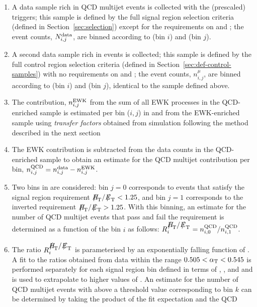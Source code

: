 \begin{enumerate}
\item\label{item:data} A data sample rich in QCD multijet events is
  collected with the (prescaled) \httrigger triggers; this sample is
  defined by the full signal region selection criteria (defined in
  Section~\ref{sec:selection}) except for the requirements on \alphat
  and \mhtmet; the event counts, $N^{\rm data}_{i,j}$, are binned
  according to \alphat (bin $i$) and \mhtmet (bin $j$).
\item\label{item:mj} A second data sample rich in \mj events is
  collected; this sample
  is defined by the full \mj control region selection criteria
  (defined in Section~\ref{sec:def-control-samples}) with no
  requirements on \alphat and \mhtmet; the event counts,
  $n^{\mu}_{i,j}$, are binned according to \alphat (bin $i$) and
  \mhtmet (bin $j$), identical to the sample defined above.
\item\label{item:ewk} The contribution, $n^{\rm EWK}_{i,j}$ from the
  sum of all EWK processes in the QCD-enriched sample is estimated per
  bin ($i,j$) in \alphat and \mhtmet from the EWK-enriched \mj sample
  using {\it transfer factors} obtained from simulation following the
  method described in the next section
\item\label{item:qcd} The EWK contribution is subtracted from the data
  counts in the QCD-enriched sample to obtain an estimate for the QCD
  multijet contribution per bin, \ie $n^{\rm QCD}_{i,j} = n^{\rm
    data}_{i,j} - n^{\rm EWK}_{i,j}$.
\item Two bins in \mhtmet are considered: bin $j=0$ corresponds to
  events that satisfy the signal region requirement $\mhtmet < 1.25$,
  and bin $j=1$ corresponds to the inverted requirement $\mhtmet >
  1.25$. With this binning, an estimate for the number of QCD multijet
  events that pass and fail the \mhtmet requirement is determined as a
  function of the \alphat bin $i$ as follows: $R_{i}^{\mhtmet} =
  n^{\rm QCD}_{i,0} / n^{\rm QCD}_{i,1}$.
\item\label{item:ratio} The ratio $R_{i}^{\mhtmet}$ is parameterised
  by an exponentially falling function of \alphat. A fit to the ratios
  obtained from data within the range $0.505 < \alpha_{\text{T}} < 0.545$ is
  performed separately for each signal region bin defined in terms of
  \njet, \nb, and \scalht and is used to extrapolate to higher values
  of \alphat. An estimate for the number of QCD multijet events with
  \alphat above a threshold value corresponding to bin $k$ can be
  determined by taking the product of the fit expectation and the QCD

\end{enumerate}
